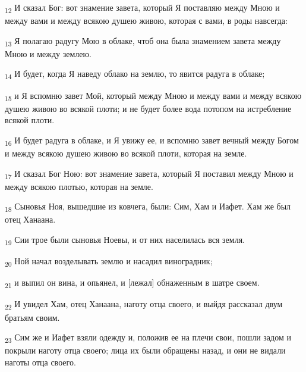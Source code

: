 \begin{tcolorbox}
\textsubscript{12} И сказал Бог: вот знамение завета, который Я поставляю между Мною и между вами и между всякою душею живою, которая с вами, в роды навсегда:
\end{tcolorbox}
\begin{tcolorbox}
\textsubscript{13} Я полагаю радугу Мою в облаке, чтоб она была знамением завета между Мною и между землею.
\end{tcolorbox}
\begin{tcolorbox}
\textsubscript{14} И будет, когда Я наведу облако на землю, то явится радуга в облаке;
\end{tcolorbox}
\begin{tcolorbox}
\textsubscript{15} и Я вспомню завет Мой, который между Мною и между вами и между всякою душею живою во всякой плоти; и не будет более вода потопом на истребление всякой плоти.
\end{tcolorbox}
\begin{tcolorbox}
\textsubscript{16} И будет радуга в облаке, и Я увижу ее, и вспомню завет вечный между Богом и между всякою душею живою во всякой плоти, которая на земле.
\end{tcolorbox}
\begin{tcolorbox}
\textsubscript{17} И сказал Бог Ною: вот знамение завета, который Я поставил между Мною и между всякою плотью, которая на земле.
\end{tcolorbox}
\begin{tcolorbox}
\textsubscript{18} Сыновья Ноя, вышедшие из ковчега, были: Сим, Хам и Иафет. Хам же был отец Ханаана.
\end{tcolorbox}
\begin{tcolorbox}
\textsubscript{19} Сии трое были сыновья Ноевы, и от них населилась вся земля.
\end{tcolorbox}
\begin{tcolorbox}
\textsubscript{20} Ной начал возделывать землю и насадил виноградник;
\end{tcolorbox}
\begin{tcolorbox}
\textsubscript{21} и выпил он вина, и опьянел, и [лежал] обнаженным в шатре своем.
\end{tcolorbox}
\begin{tcolorbox}
\textsubscript{22} И увидел Хам, отец Ханаана, наготу отца своего, и выйдя рассказал двум братьям своим.
\end{tcolorbox}
\begin{tcolorbox}
\textsubscript{23} Сим же и Иафет взяли одежду и, положив ее на плечи свои, пошли задом и покрыли наготу отца своего; лица их были обращены назад, и они не видали наготы отца своего.
\end{tcolorbox}
